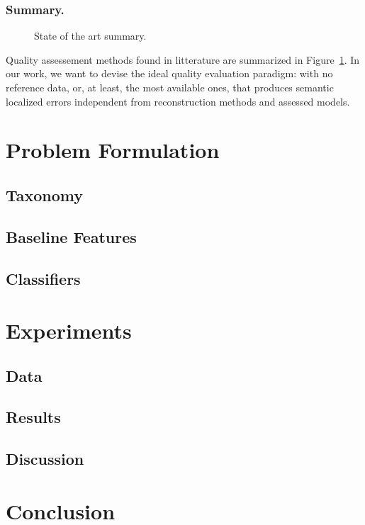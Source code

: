 \documentclass[runningheads]{llncs}
\begin{document}
\subsubsection{Summary.}
\begin{figure}[H]
	\begin{center}
		
		\caption{\label{fig::state_of_art} State of the art summary.}
	\end{center}
\end{figure}
Quality assessement methods found in litterature are summarized in Figure~\ref{fig::state_of_art}. In our work, we want to devise the ideal quality evaluation paradigm: with no reference data, or, at least, the most available ones, that produces semantic localized errors independent from reconstruction methods and assessed models.
\section{Problem Formulation}
\subsection{Taxonomy}
\subsection{Baseline Features}
\subsection{Classifiers}
\section{Experiments}
\subsection{Data}
\subsection{Results}
\subsection{Discussion}
\section{Conclusion}



\end{document}
